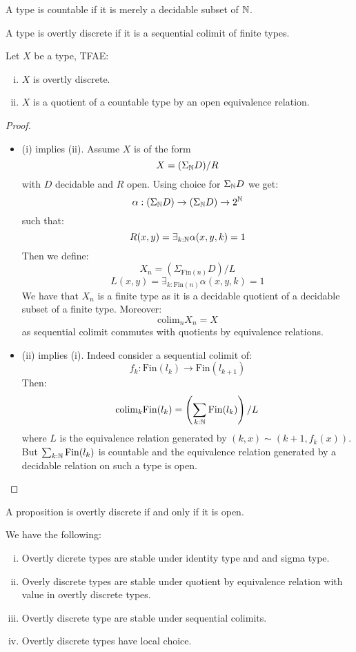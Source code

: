 \begin{definition}
A type is countable if it is merely a decidable subset of $\mathbb{N}$.
\end{definition}

\begin{definition}
A type is overtly discrete if it is a sequential colimit of finite types.
\end{definition}

\begin{lemma}\label{overtly-discrete-colimit-finite}
Let $X$ be a type, TFAE:
\begin{enumerate}[(i)]
\item $X$ is overtly discrete.
\item $X$ is a quotient of a countable type by an open equivalence relation.
\end{enumerate}
\end{lemma}

\begin{proof}
\begin{itemize}
\item (i) implies (ii). Assume $X$ is of the form
\[X  = (\Sigma_{\mathbb{N}} D)/R\]
with $D$ decidable and $R$ open. Using choice for $\Sigma_{\mathbb{N}} D$ we get:
\[\alpha : (\Sigma_{\mathbb{N}} D) \to (\Sigma_{\mathbb{N}} D)\to 2^{\mathbb{N}}\]
such that:
\[R(x,y) = \exists_{k:\mathbb{N}} \alpha(x,y,k) = 1\]
Then we define:
\[X_n = (\Sigma_{\mathrm{Fin}(n)} D) / L\]
\[L(x,y) = \exists_{k:\mathrm{Fin}(n)} \alpha(x,y,k) = 1\]
We have that $X_n$ is a finite type as it is a decidable quotient of a decidable subset of a finite type. Moreover:
\[\mathrm{colim}_n X_n = X\]
as sequential colimit commutes with quotients by equivalence relations.
\item (ii) implies (i). Indeed consider a sequential colimit of:
\[f_k : \mathrm{Fin}(l_k) \to \mathrm{Fin}(l_{k+1})\]
Then:
\[\mathrm{colim}_k \mathrm{Fin}(l_k)  =  \left(\sum_{k:\mathbb{N}} \mathrm{Fin}(l_k)\right) / L\]
where $L$ is the equivalence relation generated by $(k,x) \sim (k+1,f_k(x))$. But $\sum_{k:\mathbb{N}} \mathrm{Fin}(l_k)$ is countable and the equivalence relation generated by a decidable relation on such a type is open.
\end{itemize}
\end{proof}

\begin{remark}
A proposition is overtly discrete if and only if it is open.
\end{remark}

\begin{theorem}
We have the following:
\begin{enumerate}[(i)]
\item Overtly dicrete types are stable under identity type and and sigma type.
\item Overly discrete types are stable under quotient by equivalence relation with value in overtly discrete types.
\item Overtly discrete type are stable under sequential colimits.
\item Overtly discrete types have local choice.
\end{enumerate}
\end{theorem}

